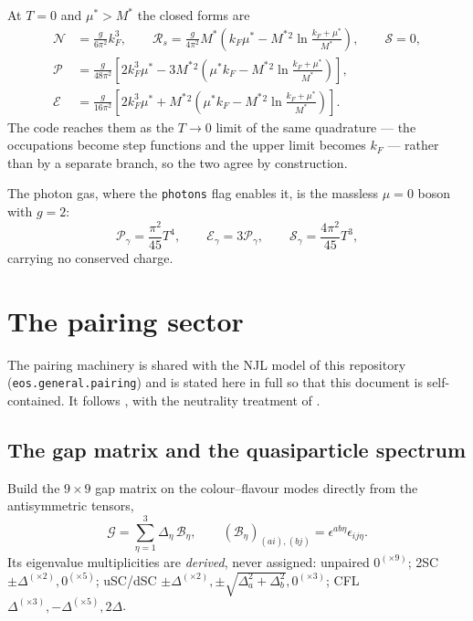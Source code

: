 \documentclass[11pt,a4paper]{article}
\newcommand{\Mstar}{M^{*}}
\newcommand{\mustar}{\mu^{*}}
\newcommand{\code}[1]{\texttt{#1}}
\begin{document}
At $T=0$ and $\mustar>\Mstar$ the closed forms are
\begin{align}
\mathcal N &= \frac{g}{6\pi^2}k_F^3,
\qquad
\mathcal R_s = \frac{g}{4\pi^2}\Mstar\left(k_F\mustar
 - \Mstar{}^2\ln\frac{k_F+\mustar}{\Mstar}\right),
\qquad \mathcal S = 0,
\\
\mathcal P &= \frac{g}{48\pi^2}\left[2k_F^3\mustar
 - 3\Mstar{}^2\left(\mustar k_F - \Mstar{}^2\ln\frac{k_F+\mustar}{\Mstar}\right)\right],
\\
\mathcal E &= \frac{g}{16\pi^2}\left[2k_F^3\mustar
 + \Mstar{}^2\left(\mustar k_F - \Mstar{}^2\ln\frac{k_F+\mustar}{\Mstar}\right)\right].
\end{align}
The code reaches them as the $T\to0$ limit of the same quadrature --- the
occupations become step functions and the upper limit becomes $k_F$ --- rather
than by a separate branch, so the two agree by construction.

The photon gas, where the \code{photons} flag enables it, is the massless
$\mu=0$ boson with $g=2$:
\begin{equation}
\mathcal P_\gamma = \frac{\pi^2}{45}T^4,\qquad
\mathcal E_\gamma = 3\mathcal P_\gamma,\qquad
\mathcal S_\gamma = \frac{4\pi^2}{45}T^3,
\label{eq:photon}
\end{equation}
carrying no conserved charge.

\section{The pairing sector}
\label{sec:pairing}

The pairing machinery is shared with the NJL model of this repository
(\code{eos.general.pairing}) and is stated here in full so that this document
is self-contained. It follows \cite{Buballa2005,Alford2008,Ruester2005}, with
the neutrality treatment of \cite{Steiner2002}.

\subsection{The gap matrix and the quasiparticle spectrum}

Build the $9\times9$ gap matrix on the colour--flavour modes directly from the
antisymmetric tensors,
\begin{equation}
\mathcal G = \sum_{\eta=1}^{3}\Delta_\eta\,\mathcal B_\eta,
\qquad
\left(\mathcal B_\eta\right)_{(ai),(bj)} = \epsilon^{ab\eta}\epsilon_{ij\eta}.
\label{eq:gapmatrix}
\end{equation}
Its eigenvalue multiplicities are \emph{derived}, never assigned: unpaired
$0^{(\times9)}$; 2SC $\pm\Delta^{(\times2)},0^{(\times5)}$; uSC/dSC
$\pm\Delta^{(\times2)},\pm\sqrt{\Delta_a^2+\Delta_b^2},0^{(\times3)}$; CFL
$\Delta^{(\times3)},-\Delta^{(\times5)},2\Delta$.
\end{document}
